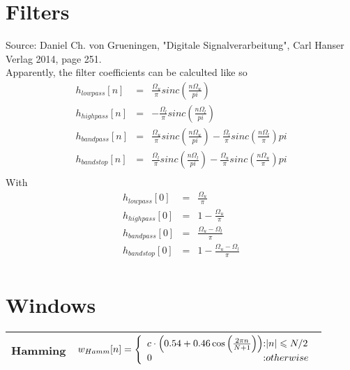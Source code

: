 \documentclass{article}
\begin{document}
\section{Filters}
Source: Daniel Ch. von Grueningen, "Digitale Signalverarbeitung", Carl Hanser Verlag 2014, page 251.\\

Apparently, the filter coefficients can be calculted like so
\begin{eqnarray*}
h_{lowpass}[n]&=& \frac{\Omega_u}{\pi}sinc \left(\frac{n\Omega_u}{pi}\right)\\
h_{highpass}[n]&=&-\frac{\Omega_l}{\pi}sinc \left(\frac{n\Omega_l}{pi}\right) \\
h_{bandpass}[n]&=& \frac{\Omega_u}{\pi}sinc \left(\frac{n\Omega_u}{pi}\right)-\frac{\Omega_l}{\pi}sinc \left(\frac{n\Omega_l}{\pi}\right){pi}\\
h_{bandstop}[n]&=& \frac{\Omega_l}{\pi}sinc \left(\frac{n\Omega_l}{pi}\right)-\frac{\Omega_u}{\pi}sinc \left(\frac{n\Omega_u}{\pi}\right){pi}\\
\end{eqnarray*}
With
\begin{eqnarray*}
h_{lowpass}[0]&=&\frac{\Omega_u}{\pi}\\
h_{highpass}[0]&=&1-\frac{\Omega_u}{\pi}\\
h_{bandpass}[0]&=&\frac{\Omega_u-\Omega_l}{\pi}\\
h_{bandstop}[0]&=&1-\frac{\Omega_u-\Omega_l}{\pi}\\
\end{eqnarray*}
\section{Windows}
\begin{tabular}{l|c}
Hamming&$w_{Hamm}[n]=\left\{\begin{array}{l@{:}l}c\cdot\left( 0.54+0.46\cos\left(\frac{2\pi n}{N+1}\right)\right)&|n|\leqslant N/2\\0&otherwise\\\end{array}\right.$\\\hline  %
\end{tabular}
\end{document}
